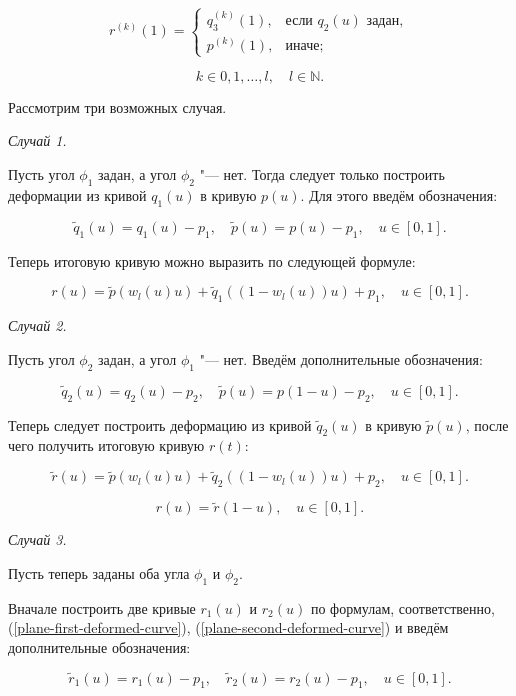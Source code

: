 \begin{equation*}
r^{(k)}(1)=
  \begin{cases}
    q_3^{(k)}(1), & \text{если $q_2(u)$ задан}, \\
    p^{(k)}(1),   & \text{иначе};
  \end{cases}
\end{equation*}

$$
k \in {0,1,\dots,l}, \quad l \in \mathbb{N}.
$$

Рассмотрим три возможных случая.

\bigskip
\textit{Случай 1.}

Пусть угол $\phi_1$ задан, а угол $\phi_2$ "--- нет. Тогда следует только построить деформации из кривой $q_1(u)$ в
кривую $p(u)$. Для этого введём обозначения:

$$
\tilde q_1(u)=q_1(u)-p_1, \quad \tilde p(u)=p(u)-p_1, \quad u \in [0,1].
$$

Теперь итоговую кривую можно выразить по следующей формуле:

\begin{equation}
r(u)=\tilde p(w_l(u)u)+\tilde q_1((1-w_l(u))u)+p_1, \quad u \in [0,1].
\label{plane-first-deformed-curve}
\end{equation}

\bigskip
\textit{Случай 2.}

Пусть угол $\phi_2$ задан, а угол $\phi_1$ "--- нет. Введём дополнительные обозначения:

$$
\tilde q_2(u)=q_2(u)-p_2, \quad \tilde p(u)=p(1-u)-p_2, \quad u \in [0,1].
$$

Теперь следует построить деформацию из кривой $\tilde q_2(u)$ в кривую $\tilde p(u)$, после чего получить итоговую
кривую $r(t)$:

$$
\tilde r(u)=\tilde p(w_l(u)u)+\tilde q_2((1-w_l(u))u)+p_2, \quad u \in [0,1].
$$

\begin{equation}
r(u)=\tilde r(1-u), \quad u \in [0,1].
\label{plane-second-deformed-curve}
\end{equation}

\bigskip
\textit{Случай 3.}

Пусть теперь заданы оба угла $\phi_1$ и $\phi_2$.

Вначале построить две кривые $r_1(u)$ и $r_2(u)$ по формулам, соответственно, (\ref{plane-first-deformed-curve}),
(\ref{plane-second-deformed-curve}) и введём дополнительные обозначения:

$$
\tilde r_1(u)=r_1(u)-p_1, \quad \tilde r_2(u)=r_2(u)-p_1, \quad u \in [0,1].
$$

